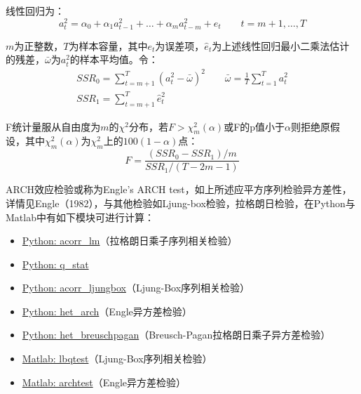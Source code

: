 \documentclass[11pt]{article}
\begin{document}
线性回归为：
\begin{equation*}
    a^2_t = \alpha_0 + \alpha_1 a^{2}_{t-1} + \dots + \alpha_m a^{2}_{t-m} + e_t \qquad t=m+1,\dots,T
\end{equation*}

$m$为正整数，$T$为样本容量，其中$e_t$为误差项，$\hat{e}_t$为上述线性回归最小二乘法估计的残差，$\bar{\omega}$为$a_t^2$的样本平均值。令：
\begin{gather*}
    SSR_0 = \sum_{t=m+1}^{T} (a_t^2 - \bar{\omega})^2 \qquad
    \bar{\omega} = \frac{1}{T} \sum_{t=1}^{T} a_t^2 \\
    SSR_1 = \sum_{t=m+1}^{T} \hat{e}_t^2
\end{gather*}

F统计量服从自由度为$m$的$\chi^2$分布，若$F>\chi_m^2(\alpha)$或F的p值小于$\alpha$则拒绝原假设，其中$\chi_m^2(\alpha)$为$\chi_m^2$上的$100(1-\alpha)$点：
\begin{equation*}
    F = \frac{(SSR_0-SSR_1)/m}{SSR_1/(T-2m-1)}
\end{equation*}

\begin{remark}
    ARCH效应检验或称为Engle's ARCH test，如上所述应平方序列检验异方差性，详情见Engle（1982），与其他检验如Ljung-box检验，拉格朗日检验，在Python与Matlab中有如下模块可进行计算：
    \begin{itemize}
        \item \href{https://www.statsmodels.org/stable/generated/statsmodels.stats.diagnostic.acorr_lm.html}{Python: acorr\_lm}（拉格朗日乘子序列相关检验）
        \item \href{https://www.statsmodels.org/stable/generated/statsmodels.tsa.stattools.q_stat.html#statsmodels.tsa.stattools.q_stat}{Python: q\_stat}
        \item \href{https://www.statsmodels.org/stable/generated/statsmodels.stats.diagnostic.acorr\_ljungbox.html}{Python: acorr\_ljungbox}（Ljung-Box序列相关检验）
        \item \href{https://www.statsmodels.org/stable/generated/statsmodels.stats.diagnostic.het\_arch.html}{Python: het\_arch}（Engle异方差检验）
        \item \href{https://www.statsmodels.org/stable/generated/statsmodels.stats.diagnostic.het\_breuschpagan.html}{Python: het\_breuschpagan}（Breusch-Pagan拉格朗日乘子异方差检验）
        \item \href{https://www.mathworks.com/help/econ/lbqtest.html}{Matlab: lbqtest}（Ljung-Box序列相关检验）
        \item \href{https://www.mathworks.com/help/econ/archtest.html}{Matlab: archtest}（Engle异方差检验）
    \end{itemize}
\end{remark}
\end{document}
